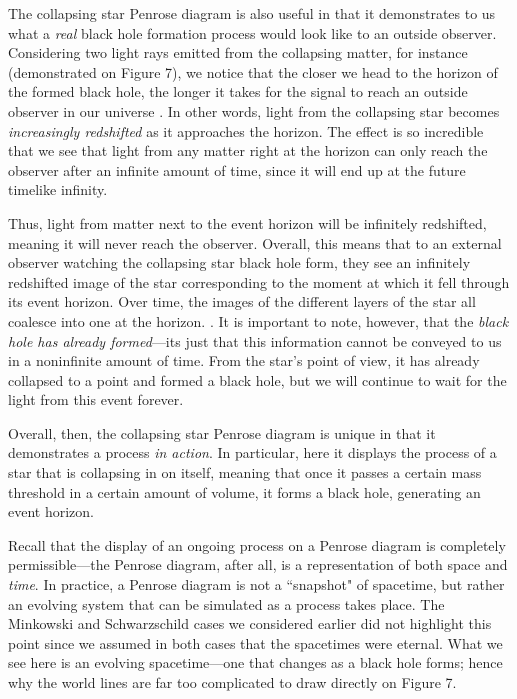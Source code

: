 \documentclass{article}
\begin{document}
The collapsing star Penrose diagram is also useful in that it demonstrates to us what a \textit{real} black hole formation process would look like to an outside observer. Considering two light rays emitted from the collapsing matter, for instance (demonstrated on Figure 7), we notice that the closer we head to the horizon of the formed black hole, the longer it takes for the signal to reach an outside observer in our universe \cite{2022Penrose}. In other words, light from the collapsing star becomes \textit{increasingly redshifted} as it approaches the horizon. The effect is so incredible that we see that light from any matter right at the horizon can only reach the observer after an infinite amount of time, since it will end up at the future timelike infinity. 

Thus, light from matter next to the event horizon will be infinitely redshifted, meaning it will never reach the observer. Overall, this means that to an external observer watching the collapsing star black hole form, they see an infinitely redshifted image of the star corresponding to the moment at which it fell through its event horizon. Over time, the images of the different layers of the star all coalesce into one at the horizon. \cite{collapse_colorado}. It is important to note, however, that the \textit{black hole has already formed}---its just that this information cannot be conveyed to us in a noninfinite amount of time. From the star's point of view, it has already collapsed to a point and formed a black hole, but we will continue to wait for the light from this event forever.

Overall, then, the collapsing star Penrose diagram is unique in that it demonstrates a process \textit{in action}. In particular, here it displays the process of a star that is collapsing in on itself, meaning that once it passes a certain mass threshold in a certain amount of volume, it forms a black hole, generating an event horizon. 

Recall that the display of an ongoing process on a Penrose diagram is completely permissible---the Penrose diagram, after all, is a representation of both space and \textit{time}. In practice, a Penrose diagram is not a ``snapshot" of spacetime, but rather an evolving system that can be simulated as a process takes place. The Minkowski and Schwarzschild cases we considered earlier did not highlight this point since we assumed in both cases that the spacetimes were eternal. What we see here is an evolving spacetime---one that changes as a black hole forms; hence why the world lines are far too complicated to draw directly on Figure 7.
\end{document}
